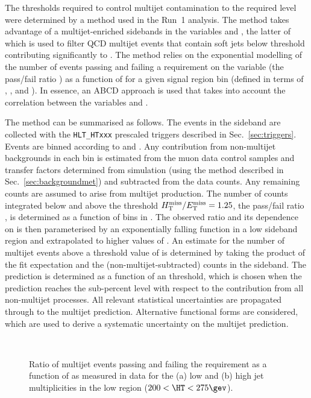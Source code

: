 The \alphat thresholds required to control multijet contamination to
the required level were determined by a method used in the Run~1
analysis. The method takes advantage of a multijet-enriched sidebands
in the variables \alphat and \mhtmet, the latter of which is used to
filter QCD multijet events that contain soft jets below threshold
contributing significantly to \mht. The method relies on the
exponential modelling of the number of events passing and failing a
requirement on the variable \mhtmet (\ie the pass/fail ratio \rmhtmet)
as a function of \alphat for a given signal region bin (defined in
terms of \njet, \nb, and \scalht). In essence, an ABCD approach is
used that takes into account the correlation between the variables
\rmhtmet and \alphat.

The method can be summarised as follows. The events in the sideband
are collected with the \texttt{HLT\_HTxxx} prescaled triggers
described in Sec.~\ref{sec:triggers}. Events are binned according to \alphat
and \mhtmet. Any contribution from non-multijet backgrounds in each
bin is estimated from the muon data control samples and transfer
factors determined from simulation (using the method described in
Sec.~\ref{sec:backgroundmet}) and subtracted from the data counts. Any remaining counts
are assumed to arise from multijet production. The number of counts
integrated below and above the threshold $\mhtmet = 1.25$, \ie the
pass/fail ratio \rmhtmet, is determined as a function of bins in
\alphat. The observed ratio and its dependence on \alphat is then
parameterised by an exponentially falling function in a low \alphat
sideband region and extrapolated to higher values of \alphat. An
estimate for the number of multijet events above a threshold value of
\alphat is determined by taking the product of the fit expectation and
the (non-multijet-subtracted) counts in the \mhtmet sideband. The
prediction is determined as a function of an \alphat threshold, which
is chosen when the prediction reaches the sub-percent level with
respect to the contribution from all non-multijet processes. All
relevant statistical uncertainties are propagated through to the
multijet prediction. Alternative functional forms are considered,
which are used to derive a systematic uncertainty on the multijet
prediction. 

\begin{figure}[!h]
  \centering
   \\
  \caption{Ratio of multijet events passing and failing the \mhtmet
    requirement as a function of \alphat as measured in data for the
    (a) low and (b) high jet multiplicities in
    the low \HT region ($200 < \HT < 275\gev$). }
  \label{fig:qcd-ratio-data}
\end{figure}

